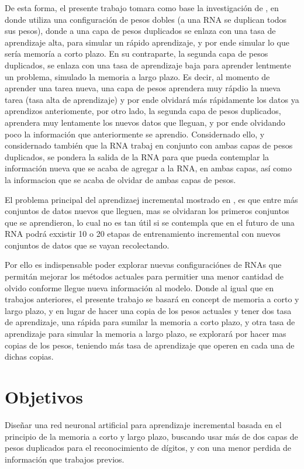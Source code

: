 De esta forma, el presente trabajo tomara como base la investigación de \cite{Bullinaria2009}, en donde utiliza una configuración de pesos dobles (a una RNA se duplican todos sus pesos), donde a una capa de pesos duplicados se enlaza con una tasa de aprendizaje alta, para simular un rápido aprendizaje, y por ende simular lo que sería memoría a corto plazo. En su contraparte, la segunda capa de pesos duplicados, se enlaza con una tasa de aprendizaje baja para aprender lentmente un problema, simulado la memoria a largo plazo.  Es decir, al momento de aprender una tarea nueva,  una capa de pesos aprendera muy rápdio la nueva tarea (tasa alta de aprendizaje) y por ende olvidará más rápidamente los datos ya aprendizos anteriomente, por otro lado, la segunda capa de pesos duplicados, aprendera muy lentamente los nuevos datos que lleguan, y por ende olvidando poco la información que anteriormente se aprendio.  Considernado ello, y considernado también que la RNA trabaj en conjunto con ambas capas de pesos duplicados, se pondera la salida de la RNA para que pueda contemplar la información nueva que se acaba de agregar a la RNA, en ambas capas, así como la informacion que se acaba de olvidar de ambas capas de pesos.

El problema principal del aprendizaej incremental mostrado en \cite{Bullinaria2009}, es que entre más conjuntos de datos nuevos que lleguen,  mas se olvidaran los primeros conjuntos que se aprendieron, lo cual no es tan útil si se contempla que en el futuro de una RNA podrá exxistir 10 o 20 etapas de entrenamiento incremental con nuevos conjuntos de datos que se vayan recolectando.

Por ello es indispensable poder explorar nuevas configuraciónes de RNAs que permitán mejorar los métodos actuales para permitier una menor cantidad de olvido conforme llegue nueva información al modelo. Donde al igual que en trabajos anteriores,  el presente trabajo se basará en concept de memoria a corto y largo plazo,  y en lugar de hacer una copia de los pesos actuales y tener dos tasa de aprendizaje, una rápida para sumilar la memoria a corto plazo, y otra tasa de aprendizaje para simular la memoria a largo plazo, se explorará por hacer mas copias de los pesos,  teniendo más tasa de aprendizaje que operen en cada una de dichas copias.
    
\section{Objetivos}
    Diseñar una red neuronal artificial para aprendizaje incremental basada en el principio de la memoria a corto y largo plazo, buscando usar más de dos capas de pesos duplicados para el reconocimiento de dígitos, y con una menor perdida de información que trabajos previos.
